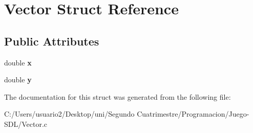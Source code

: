 \hypertarget{struct_vector}{}\section{Vector Struct Reference}
\label{struct_vector}
\subsection*{Public Attributes}
\begin{DoxyCompactItemize}
\item 
double {\bfseries x}\hypertarget{struct_vector_a133722e00601091cb2075219da5da6e4}{}\label{struct_vector_a133722e00601091cb2075219da5da6e4}

\item 
double {\bfseries y}\hypertarget{struct_vector_a09a21a140718f234eea348d5058cee0b}{}\label{struct_vector_a09a21a140718f234eea348d5058cee0b}

\end{DoxyCompactItemize}


The documentation for this struct was generated from the following file\+:\begin{DoxyCompactItemize}
\item 
C\+:/\+Users/usuario2/\+Desktop/uni/\+Segundo Cuatrimestre/\+Programacion/\+Juego-\/\+S\+D\+L/Vector.\+c\end{DoxyCompactItemize}
